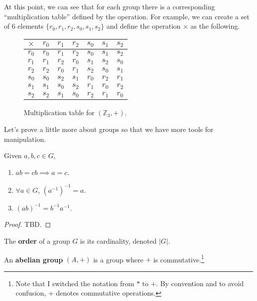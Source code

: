   At this point, we can see that for each group there is a corresponding ``multiplication table'' defined by the operation. For example, we can create a set of $6$ elements $\{r_0, r_1, r_2, s_0, s_1, s_2\}$ and define the operation $\times$ as the following. 

  \begin{figure}[H]
    \centering 
    \begin{tabular}{c|cccccc}
      $\times$ & $r_0$ & $r_1$ & $r_2$ & $s_0$ & $s_1$ & $s_2$ \\
      \hline
      $r_0$ & $r_0$ & $r_1$ & $r_2$ & $s_0$ & $s_1$ & $s_2$ \\
      $r_1$ & $r_1$ & $r_2$ & $r_0$ & $s_1$ & $s_2$ & $s_0$ \\
      $r_2$ & $r_2$ & $r_0$ & $r_1$ & $s_2$ & $s_0$ & $s_1$ \\
      $s_0$ & $s_0$ & $s_2$ & $s_1$ & $r_0$ & $r_2$ & $r_1$ \\
      $s_1$ & $s_1$ & $s_0$ & $s_2$ & $r_1$ & $r_0$ & $r_2$ \\
      $s_2$ & $s_2$ & $s_1$ & $s_0$ & $r_2$ & $r_1$ & $r_0$ \\
    \end{tabular}
    \caption{Multiplication table for $(\mathbb{Z}_3, +)$.} 
  \end{figure} 

  Let's prove a little more about groups so that we have more tools for manipulation. 

  \begin{lemma}
    Given $a, b, c \in G$, 
    \begin{enumerate}
      \item $ab = cb \implies a = c$. 
      \item $\forall a \in G$, $(a^{-1})^{-1} = a$. 
      \item $(ab)^{-1} = b^{-1} a^{-1}$. 
    \end{enumerate}
  \end{lemma}
  \begin{proof}
    TBD. 
  \end{proof}

  \begin{definition}
    The \textbf{order} of a group $G$ is its cardinality, denoted $|G|$. 
  \end{definition} 

  \begin{definition}
    An \textbf{abelian group} $(A, +)$ is a group where $+$ is commutative.\footnote{Note that I switched the notation from $\ast$ to $+$. By convention and to avoid confusion, $+$ denotes commutative operations. }
  \end{definition} 

